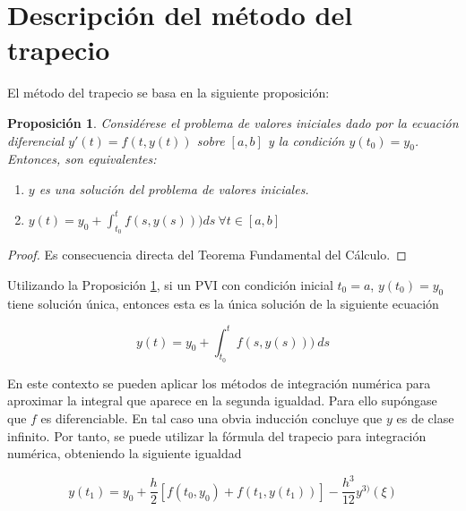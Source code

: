 \documentclass{article}
\theoremstyle{theorem-style}  %
\newtheorem{proposition}[theorem]{Proposición}
\theoremstyle{definition}
\theoremstyle{example-style}
\begin{document}

\section{Descripción del método del trapecio}

	El método del trapecio se basa en la siguiente proposición:

	\begin{proposition} \label{prop:sol-eq}
		Considérese el problema de valores iniciales dado por la ecuación diferencial $y'(t) = f(t,y(t))$ sobre $[a,b]$ y la condición $y(t_0) = y_0$.  Entonces, son equivalentes:
		\begin{enumerate}
			\item $y$ es una solución del problema de valores iniciales.
			\item $y(t) = y_0 + \int_{t_0}^{t} f(s,y(s))) ds \ \forall t \in [a,b]$
		\end{enumerate}
	\end{proposition}
	
	\begin{proof}
		Es consecuencia directa del Teorema Fundamental del Cálculo.
	\end{proof}

	
	Utilizando la Proposición \ref{prop:sol-eq}, si un PVI con condición inicial $t_0 = a$, $y(t_0) = y_0$ tiene solución única, entonces esta es la única solución de la siguiente ecuación
	
	\begin{equation}
		y(t)  = y_0 + \int_{t_0}^{t} f(s,y(s))) \ ds
	\end{equation}
	
	En este contexto se pueden aplicar los métodos de integración numérica para aproximar la integral que aparece en la segunda igualdad. Para ello supóngase que $f$ es diferenciable. En tal caso una obvia inducción concluye que $y$ es de clase infinito. Por tanto, se puede utilizar la fórmula del trapecio para integración numérica, obteniendo la siguiente igualdad
	
	\begin{equation} \label{eq:trapecio-igualdad}
		y(t_{1}) = y_0 + \frac{h}{2} \left[f(t_0,y_0) + f(t_1, y(t_1))\right] - \frac{h^3}{12}y^{3)}(\xi)
	\end{equation}
\end{document}
